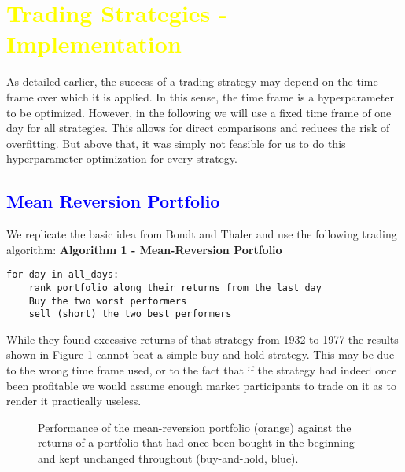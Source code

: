 \section{\textcolor{yellow}{Trading Strategies - Implementation}}
As detailed earlier, the success of a trading strategy may depend on the time frame over which it is applied. In this sense, the time frame is a hyperparameter to be optimized. However, in the following we will use a fixed time frame of one day for all strategies. This allows for direct comparisons and reduces the risk of overfitting. But above that, it was simply not feasible for us to do this hyperparameter optimization for every strategy. 

\subsection{\textcolor{blue}{Mean Reversion Portfolio}}
We replicate the basic idea from Bondt and Thaler \citet{bondt_does_1985} and use the following trading algorithm: 
\vspace{2ex}
\textbf{\small{Algorithm 1 - Mean-Reversion Portfolio}}
\vspace{-1ex}
\begin{verbatim}
for day in all_days: 
    rank portfolio along their returns from the last day
    Buy the two worst performers
    sell (short) the two best performers
\end{verbatim}

While they found excessive returns of that strategy from 1932 to 1977 the results shown in Figure \ref{fig:mean reversion} cannot beat a simple buy-and-hold strategy. This may be due to the wrong time frame used, or to the fact that if the strategy had indeed once been profitable we would assume enough market participants to trade on it as to render it practically useless. 


\begin{figure}[h!]
    \centering
    \begin{adjustbox}{width=.95\textwidth,center}
        
    \end{adjustbox}  
    \caption{Performance of the mean-reversion portfolio (orange) against the returns of a portfolio that had once been bought in the beginning and kept unchanged throughout (buy-and-hold, blue).}
    \label{fig:mean reversion}
\end{figure}{}

